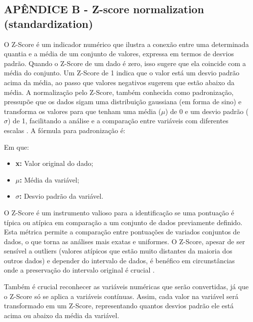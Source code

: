 \begin{apendicesenv}
\chapter{APÊNDICE B - Z-score normalization (standardization)}

O Z-Score é um indicador numérico que ilustra a conexão entre uma determinada quantia e a média de um conjunto de valores, expressa em termos de desvios padrão. Quando o Z-Score de um dado é zero, isso sugere que ela coincide com a média do conjunto. Um Z-Score de 1 indica que o valor está um desvio padrão acima da média, ao passo que valores negativos sugerem que estão abaixo da média. A normalização pelo Z-Score, também conhecida como padronização, pressupõe que os dados sigam uma distribuição gaussiana (em forma de sino) e transforma os valores para que tenham uma média (\(\mu\)) de 0 e um desvio padrão (\(\sigma\)) de 1, facilitando a análise e a comparação entre variáveis com diferentes escalas \cite{jaiswal2024, maiseretorno2022}. A fórmula para padronização é:



Em que:
\begin{itemize}
  \item \textbf{x:} Valor original do dado;
  \item \textbf{\(\mu\):} Média da variável;
  \item \textbf{\(\sigma\):} Desvio padrão da variável.
\end{itemize}

O Z-Score é um instrumento valioso para a identificação se uma pontuação é típica ou atípica em comparação a um conjunto de dados previamente definido. Esta métrica permite a comparação entre pontuações de variados conjuntos de dados, o que torna as análises mais exatas e uniformes. O Z-Score, apesar de ser sensível a outliers (valores atípicos que estão muito distantes da maioria dos outros dados) e depender do intervalo de dados, é benéfico em circunstâncias onde a preservação do intervalo original é crucial \cite{sousa2019, maiseretorno2022}.

Também é crucial reconhecer as variáveis numéricas que serão convertidas, já que o Z-Score só se aplica a variáveis contínuas. Assim, cada valor na variável será transformado em um Z-Score, representando quantos desvios padrão ele está acima ou abaixo da média da variável. 


\end{apendicesenv}
